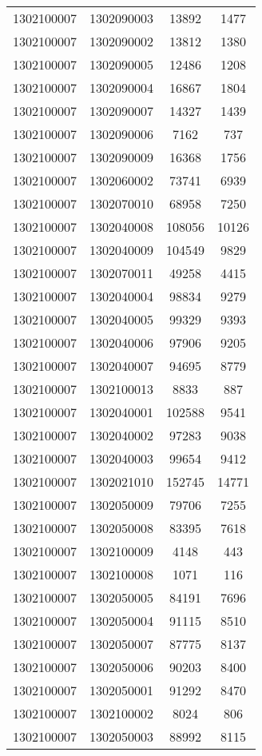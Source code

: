\begin{longtable}[h]{llcc}
		1302100007 & 1302090003 & 13892 & 1477\\
		1302100007 & 1302090002 & 13812 & 1380\\
		1302100007 & 1302090005 & 12486 & 1208\\
		1302100007 & 1302090004 & 16867 & 1804\\
		1302100007 & 1302090007 & 14327 & 1439\\
		1302100007 & 1302090006 & 7162 & 737\\
		1302100007 & 1302090009 & 16368 & 1756\\
		1302100007 & 1302060002 & 73741 & 6939\\
		1302100007 & 1302070010 & 68958 & 7250\\
		1302100007 & 1302040008 & 108056 & 10126\\
		1302100007 & 1302040009 & 104549 & 9829\\
		1302100007 & 1302070011 & 49258 & 4415\\
		1302100007 & 1302040004 & 98834 & 9279\\
		1302100007 & 1302040005 & 99329 & 9393\\
		1302100007 & 1302040006 & 97906 & 9205\\
		1302100007 & 1302040007 & 94695 & 8779\\
		1302100007 & 1302100013 & 8833 & 887\\
		1302100007 & 1302040001 & 102588 & 9541\\
		1302100007 & 1302040002 & 97283 & 9038\\
		1302100007 & 1302040003 & 99654 & 9412\\
		1302100007 & 1302021010 & 152745 & 14771\\
		1302100007 & 1302050009 & 79706 & 7255\\
		1302100007 & 1302050008 & 83395 & 7618\\
		1302100007 & 1302100009 & 4148 & 443\\
		1302100007 & 1302100008 & 1071 & 116\\
		1302100007 & 1302050005 & 84191 & 7696\\
		1302100007 & 1302050004 & 91115 & 8510\\
		1302100007 & 1302050007 & 87775 & 8137\\
		1302100007 & 1302050006 & 90203 & 8400\\
		1302100007 & 1302050001 & 91292 & 8470\\
		1302100007 & 1302100002 & 8024 & 806\\
		1302100007 & 1302050003 & 88992 & 8115\\

\end{longtable}
